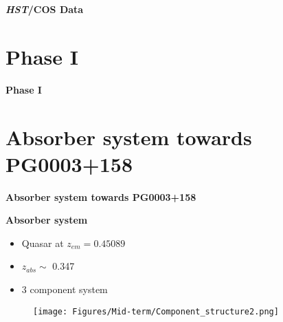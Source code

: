 \documentclass[aspectratio=169,draft]{beamer}
\begin{document}
\begin{frame}{\huge{{\textbf{\textit{HST}/COS Data}}}}


\end{frame}


\section{Phase I}

\begin{frame}{}

{\huge{\textbf{Phase I}}}

\end{frame}


\section{Absorber system towards PG0003+158}


\begin{frame}{}

{\huge{\textbf{Absorber system towards PG0003+158}}}

\end{frame}


\begin{frame}{\huge{{\textbf{Absorber system}}}}

\begin{itemize}
    \item Quasar at $z_{em}=0.45089$
    \item $z_{abs} \sim$ 0.347
    \item 3 component system
\end{itemize}

\begin{figure}[!htbp]
      \centering
      \texttt{[image: Figures/Mid-term/Component\_structure2.png]}
\end{figure}

\end{frame}
\end{document}
